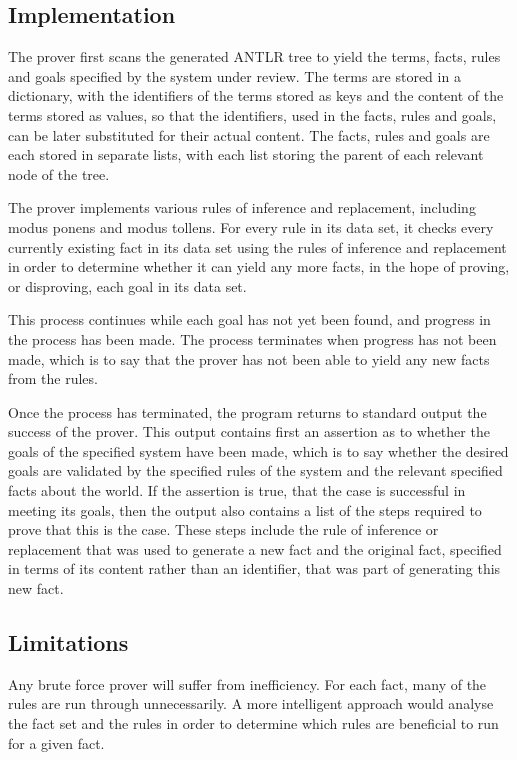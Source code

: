 \documentclass{l4proj}
\begin{document}
\subsection{Implementation}
The prover first scans the generated ANTLR tree to yield the terms, facts, rules and goals specified by the system under review. The terms are stored in a dictionary, with the identifiers of the terms stored as keys and the content of the terms stored as values, so that the identifiers, used in the facts, rules and goals, can be later substituted for their actual content. The facts, rules and goals are each stored in separate lists, with each list storing the parent  of each relevant node of the tree. 

The prover implements various rules of inference and replacement, including modus ponens and modus tollens. For every rule in its data set, it checks every currently existing fact in its data set using the rules of inference and replacement in order to determine whether it can yield any more facts, in the hope of proving, or disproving, each goal in its data set. 

This process continues while each goal has not yet been found, and progress in the process has been made. The process terminates when progress has not been made, which is to say that the prover has not been able to yield any new facts from the rules. 

Once the process has terminated, the program returns to standard output the success of the prover. This output contains first an assertion as to whether the goals of the specified system have been made, which is to say whether the desired goals are validated by the specified rules of the system and the relevant specified facts about the world. If the assertion is true, that the case is successful in meeting its goals, then the output also contains a list of the steps required to prove that this is the case. These steps include the rule of inference or replacement that was used to generate a new fact and the original fact, specified in terms of its content rather than an identifier, that was part of generating this new fact. 

\subsection{Limitations}
Any brute force prover will suffer from inefficiency. For each fact, many of the rules are run through unnecessarily. A more intelligent approach would analyse the fact set and the rules in order to determine which rules are beneficial to run for a given fact. 
\end{document}
